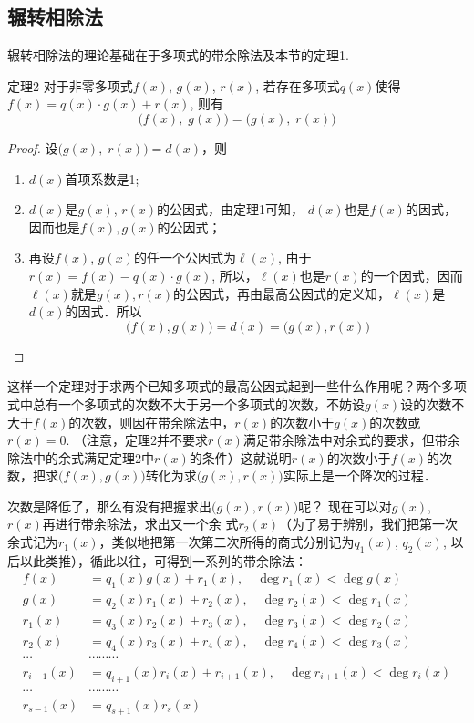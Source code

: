 \subsection{辗转相除法}

辗转相除法的理论基础在于多项式的带余除法及本节的定理1.

\begin{blk}{定理2}
    对于非零多项式$f(x)$, $g(x)$, $r(x)$, 若存在多项式$q(x)$使得$f(x)=q(x)\cdot g(x)+r(x)$, 则有
    \[\big(f(x),\; g(x)\big)=\big(g(x),\; r(x)\big)\]
\end{blk}

\begin{proof}
设$\big(g(x),\; r(x)\big)=d(x)$，则
\begin{enumerate}
\item $d(x)$首项系数是1;
\item $d(x)$是$g(x)$, $r(x)$的公因式，由定理1可知，
$d(x)$也是$f(x)$的因式，因而也是$f(x),g(x)$的公因式；    
\item 再设$f(x)$, $g(x)$的任一个公因式为$\ell(x)$, 由于$r(x)=f(x)-q(x)\cdot g(x)$, 所以，$\ell(x)$也是$r(x)$的一个因式，因而$\ell(x)$就是$g(x),r(x)$的公因式，再由最高公因式的定义知，$\ell(x)$是$d(x)$的因式．所以
\[\big(f (x) ,g (x) \big) =d (x) = \big(g (x) ,r (x) \big)\]
\end{enumerate}
\end{proof}

这样一个定理对于求两个已知多项式的最高公因式起到一些什么作用呢？两个多项式中总有一个多项式的次数不大于另一个多项式的次数，不妨设$g(x)$设的次数不大于$f(x)$的次数，则因在带余除法中，$r(x)$的次数小于$g(x)$的次数或$r(x)=0$. （注意，定理2并不要求$r(x)$满足带余除法中对余式的要求，但带余除法中的余式满足定理2中$r(x)$的条件）这就说明$r(x)$的次数小于$f(x)$的次数，把求$\big(f(x), g(x)\big)$转化为求$\big(g(x), r(x)\big)$实际上是一个降次的过程．

次数是降低了，那么有没有把握求出$\big(g(x),r(x)\big)$呢？
现在可以对$g(x)$, $r(x)$再进行带余除法，求出又一个余
式$r_2(x)$（为了易于辨别，我们把第一次余式记为$r_1(x)$，类似地把第一次第二次所得的商式分别记为$q_1(x)$, $q_2(x)$, 以后以此类推），循此以往，可得到一系列的带余除法：
\begin{equation}
    \begin{split}
f(x)&=q_1(x)g(x)+r_1(x),\quad \deg r_1(x)<\deg g(x)\\
g(x)&=q_2(x)r_1(x)+r_2(x),\quad \deg r_2(x)<\deg r_1(x)\\
r_1(x)&=q_3(x)r_2(x)+r_3(x),\quad \deg r_3(x)<\deg r_2(x)\\
r_2(x)&=q_4(x)r_3(x)+r_4(x),\quad \deg r_4(x)<\deg r_3(x)\\
\cdots &\cdots \cdots \cdots \\
r_{i-1}(x)&=q_{i+1}(x)r_i(x)+r_{i+1}(x),\quad \deg r_{i+1}(x)<\deg r_i(x)\\
\cdots &\cdots \cdots \cdots \\
r_{s-1}(x)&=q_{s+1}(x)r_s(x)
\end{split}
\end{equation}

